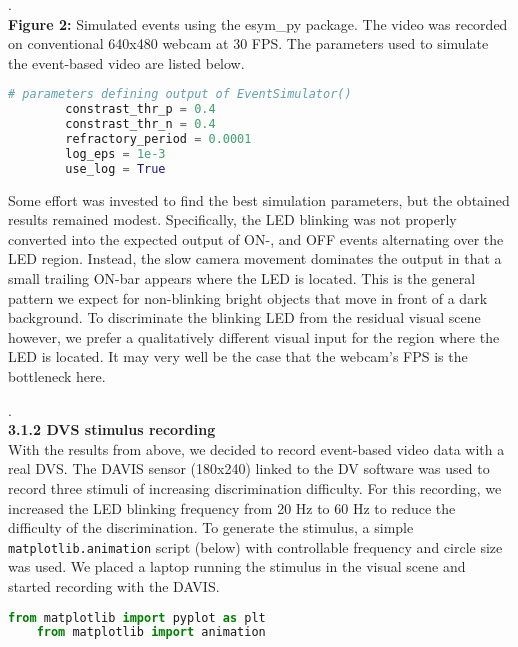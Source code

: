 \documentclass[8pt]{beamer}
\begin{document}
\begin{small}
	\tiny .\\
	\justify
	\footnotesize
	\textbf{Figure 2:} Simulated events using the esym\_py package. The
	video was recorded on conventional 640x480 webcam at 30 FPS. The
	parameters used to simulate the event-based video are listed below.
		
	\begin{lstlisting}[language=Python]
		# parameters defining output of EventSimulator()
		constrast_thr_p = 0.4
		constrast_thr_n = 0.4
		refractory_period = 0.0001
		log_eps = 1e-3
		use_log = True
	\end{lstlisting}
	\pagebreak	

	\small
	\selectfont
	Some effort was invested to find the best simulation parameters, but the
	obtained results remained modest. Specifically, the LED blinking was not
	properly converted into the expected output of ON-, and OFF events
	alternating over the LED region. Instead, the slow camera movement dominates
	the output in that a small trailing ON-bar appears where the LED is located.
	This is the general pattern we expect for non-blinking bright objects that
	move in front of a dark background. To discriminate the blinking LED from
	the residual visual scene however, we prefer a qualitatively different
	visual input for the region where the LED is located. It may very well be
	the case that the webcam's FPS is the bottleneck here. 

	\tiny .\\
	\small
	\selectfont
	\hspace{.2cm} \textbf{3.1.2 DVS stimulus recording} \\ 
	With the results from above, we decided to record event-based video data
	with a real DVS. The DAVIS sensor (180x240) linked to the DV software was
	used to record three stimuli of increasing discrimination difficulty. For
	this recording, we increased the LED blinking frequency from 20 Hz to 60 Hz
	to reduce the difficulty of the discrimination. To generate the stimulus, a
	simple \verb|matplotlib.animation| script (below) with controllable
	frequency and circle size was used. We placed a laptop running the stimulus
	in the visual scene and started recording with the DAVIS. \\

	\begin{lstlisting}[language=Python]
	from matplotlib import pyplot as plt
	from matplotlib import animation
	

\end{lstlisting}
\end{small}
\end{document}
